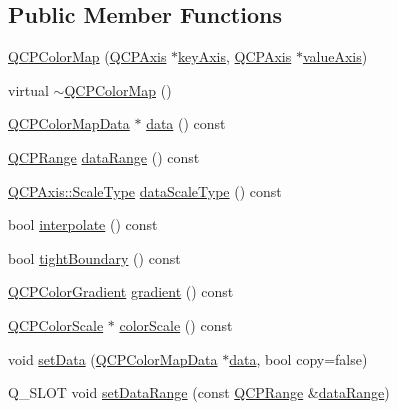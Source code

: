 \subsection*{Public Member Functions}
\begin{DoxyCompactItemize}
\item 
\hyperlink{class_q_c_p_color_map_aa37e976d2ee1e2be6c4cd88a64b36215}{Q\+C\+P\+Color\+Map} (\hyperlink{class_q_c_p_axis}{Q\+C\+P\+Axis} $\ast$\hyperlink{class_q_c_p_abstract_plottable_a2cdd6f0dd5e9a979037f86b4000d9cfe}{key\+Axis}, \hyperlink{class_q_c_p_axis}{Q\+C\+P\+Axis} $\ast$\hyperlink{class_q_c_p_abstract_plottable_af47809a644a68ffd955fb30b01fb4f2f}{value\+Axis})
\item 
virtual \hyperlink{class_q_c_p_color_map_ac8a952a40fed62dcee33405b0f4d47ad}{$\sim$\+Q\+C\+P\+Color\+Map} ()
\item 
\hyperlink{class_q_c_p_color_map_data}{Q\+C\+P\+Color\+Map\+Data} $\ast$ \hyperlink{class_q_c_p_color_map_a047d7eb3ae657f93f2f39b5e68b79451}{data} () const
\item 
\hyperlink{class_q_c_p_range}{Q\+C\+P\+Range} \hyperlink{class_q_c_p_color_map_ae478f0a5a016420d66c70cc33d6cda1d}{data\+Range} () const
\item 
\hyperlink{class_q_c_p_axis_a36d8e8658dbaa179bf2aeb973db2d6f0}{Q\+C\+P\+Axis\+::\+Scale\+Type} \hyperlink{class_q_c_p_color_map_ab796f2dccc90fb7a354b6732c33ec9be}{data\+Scale\+Type} () const
\item 
bool \hyperlink{class_q_c_p_color_map_a15d1877883fa463d44bfcbfd6840d4ca}{interpolate} () const
\item 
bool \hyperlink{class_q_c_p_color_map_a53b5d26b28d6027af0fc863f057965db}{tight\+Boundary} () const
\item 
\hyperlink{class_q_c_p_color_gradient}{Q\+C\+P\+Color\+Gradient} \hyperlink{class_q_c_p_color_map_acc4bb87c903607b96c08d2bc34bc24cd}{gradient} () const
\item 
\hyperlink{class_q_c_p_color_scale}{Q\+C\+P\+Color\+Scale} $\ast$ \hyperlink{class_q_c_p_color_map_a9d37d08c467ac645b86fc71a3b151208}{color\+Scale} () const
\item 
void \hyperlink{class_q_c_p_color_map_a5a23e133a20c4ccad35fd32e6c0f9809}{set\+Data} (\hyperlink{class_q_c_p_color_map_data}{Q\+C\+P\+Color\+Map\+Data} $\ast$\hyperlink{class_q_c_p_color_map_a047d7eb3ae657f93f2f39b5e68b79451}{data}, bool copy=false)
\item 
Q\+\_\+\+S\+L\+OT void \hyperlink{class_q_c_p_color_map_a980b42837821159786a85b4b7dcb8774}{set\+Data\+Range} (const \hyperlink{class_q_c_p_range}{Q\+C\+P\+Range} \&\hyperlink{class_q_c_p_color_map_ae478f0a5a016420d66c70cc33d6cda1d}{data\+Range})

\end{DoxyCompactItemize}
